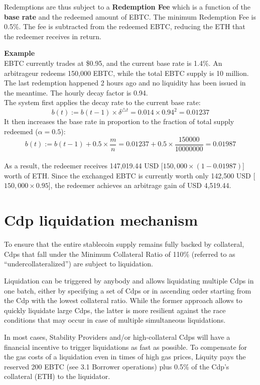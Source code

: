 \documentclass{article}
\begin{document}
Redemptions are thus subject to a \textbf{Redemption Fee} which is a function of the \textbf{base rate} and the redeemed amount of EBTC. The minimum Redemption Fee is 0.5\%. The fee is subtracted from the redeemed EBTC, reducing the ETH that the redeemer receives in return.\\
\begin{tcolorbox}
\textbf{Example}\\
EBTC currently trades at \$0.95, and the current base rate is 1.4\%. An arbitrageur redeems 150,000 EBTC, while the total EBTC supply is 10 million. The last redemption happened 2 hours ago and no liquidity has been issued in the meantime. The hourly decay factor is 0.94.\\

The system first applies the decay rate to the current base rate:
$$b(t):=b(t-1)\times\delta^{\triangle t}=0.014\times0.94^2=0.01237$$
It then increases the base rate in proportion to the fraction of total supply redeemed ($\alpha= 0.5$):
$$b(t):=b(t-1)+0.5\times\frac{m}{n}=0.01237+0.5\times\frac{150000}{10000000}=0.01987$$
\\

As a result, the redeemer receives 147,019.44 USD [$150,000 \times (1 - 0.01987)$] worth of ETH. Since the exchanged EBTC is currently worth only 142,500 USD [$150,000 \times 0.95$], the redeemer achieves an arbitrage gain of USD 4,519.44.
\end{tcolorbox}

\section{Cdp liquidation mechanism}
To ensure that the entire stablecoin supply remains fully backed by collateral, Cdps that fall under the Minimum Collateral Ratio of 110\% (referred to as “undercollateralized”) are subject to liquidation.

Liquidation can be triggered by anybody and allows liquidating multiple Cdps in one batch, either by specifying a set of Cdps or in ascending order starting from the Cdp with the lowest collateral ratio. While the former approach allows to quickly liquidate large Cdps, the latter is more resilient against the race conditions that may occur in case of multiple simultaneous liquidations.

In most cases, Stability Providers and/or high-collateral Cdps will have a financial incentive to trigger liquidations as fast as possible. To compensate for the gas costs of a liquidation even in times of high gas prices, Liquity pays the reserved 200 EBTC (see 3.1 Borrower operations) plus 0.5\% of the Cdp’s collateral (ETH) to the liquidator.
\\
\end{document}
